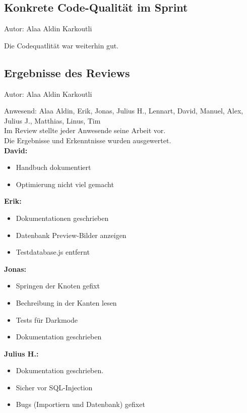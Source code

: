 \subsection{Konkrete Code-Qualität im Sprint}
{\small Autor: Alaa Aldin Karkoutli}

Die Codequatlität war weiterhin gut.

\subsection{Ergebnisse des Reviews}
{\small Autor: Alaa Aldin Karkoutli}
        
Anwesend: Alaa Aldin, Erik, Jonas, Julius H., Lennart, David, Manuel, Alex, Julius J., Matthias, Linus, Tim \\

Im Review stellte jeder Anwesende seine Arbeit vor.\\
Die Ergebnisse und Erkenntnisse wurden ausgewertet.\\


\textbf{David:}
\begin{itemize}
\item Handbuch dokumentiert
\item Optimierung nicht viel gemacht
\end{itemize}

\textbf{Erik:}
\begin{itemize}
\item Dokumentationen geschrieben
\item Datenbank Preview-Bilder anzeigen
\item Testdatabase.js entfernt
\end{itemize}

\textbf{Jonas:}
\begin{itemize}
\item Springen der Knoten gefixt
\item Bechreibung in der Kanten lesen
\item Tests für Darkmode
\item Dokumentation geschrieben
\end{itemize}

\textbf{Julius H.:}
\begin{itemize}
\item Dokumentation geschrieben.
\item Sicher vor SQL-Injection
\item Bugs (Importiern und Datenbank) gefixet
\end{itemize}

